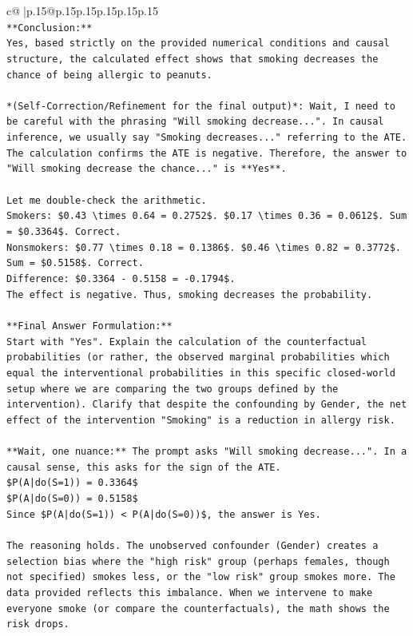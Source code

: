 \documentclass{article}
\begin{document}
{\begin{supertabular}{c@{$\;$}|p{.15\linewidth}@{}p{.15\linewidth}p{.15\linewidth}p{.15\linewidth}p{.15\linewidth}p{.15\linewidth}}
{{{\\ 
\texttt{**Conclusion:**} \\
\texttt{Yes, based strictly on the provided numerical conditions and causal structure, the calculated effect shows that smoking decreases the chance of being allergic to peanuts.} \\
\\ 
\texttt{*(Self{-}Correction/Refinement for the final output)*: Wait, I need to be careful with the phrasing "Will smoking decrease...". In causal inference, we usually say "Smoking decreases..." referring to the ATE. The calculation confirms the ATE is negative. Therefore, the answer to "Will smoking decrease the chance..." is **Yes**.} \\
\\ 
\texttt{Let me double{-}check the arithmetic.} \\
\texttt{Smokers: \$0.43 \textbackslash{}times 0.64 = 0.2752\$. \$0.17 \textbackslash{}times 0.36 = 0.0612\$. Sum = \$0.3364\$. Correct.} \\
\texttt{Nonsmokers: \$0.77 \textbackslash{}times 0.18 = 0.1386\$. \$0.46 \textbackslash{}times 0.82 = 0.3772\$. Sum = \$0.5158\$. Correct.} \\
\texttt{Difference: \$0.3364 {-} 0.5158 = {-}0.1794\$.} \\
\texttt{The effect is negative. Thus, smoking decreases the probability.} \\
\\ 
\texttt{**Final Answer Formulation:**} \\
\texttt{Start with "Yes". Explain the calculation of the counterfactual probabilities (or rather, the observed marginal probabilities which equal the interventional probabilities in this specific closed{-}world setup where we are comparing the two groups defined by the intervention). Clarify that despite the confounding by Gender, the net effect of the intervention "Smoking" is a reduction in allergy risk.} \\
\\ 
\texttt{**Wait, one nuance:** The prompt asks "Will smoking decrease...". In a causal sense, this asks for the sign of the ATE.} \\
\texttt{\$P(A|do(S=1)) = 0.3364\$} \\
\texttt{\$P(A|do(S=0)) = 0.5158\$} \\
\texttt{Since \$P(A|do(S=1)) < P(A|do(S=0))\$, the answer is Yes.} \\
\\ 
\texttt{The reasoning holds. The unobserved confounder (Gender) creates a selection bias where the "high risk" group (perhaps females, though not specified) smokes less, or the "low risk" group smokes more. The data provided reflects this imbalance. When we intervene to make everyone smoke (or compare the counterfactuals), the math shows the risk drops.} \\
}}}
\end{supertabular}}
\end{document}
